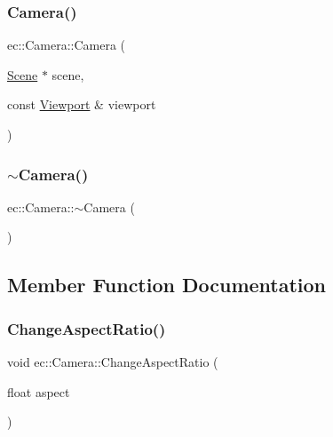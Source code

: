 \mbox{\label{classec_1_1_camera_ab5fa55c91ae586754b613c3e8f33b31c}} 
\subsubsection{\texorpdfstring{Camera()}{Camera()}\hspace{0.1cm}{\footnotesize\ttfamily [2/2]}}
{\footnotesize\ttfamily ec\+::\+Camera\+::\+Camera (\begin{DoxyParamCaption}\item[{\mbox{\hyperlink{classec_1_1_scene}{Scene}} $\ast$}]{scene,  }\item[{const \mbox{\hyperlink{classec_1_1_viewport}{Viewport}} \&}]{viewport }\end{DoxyParamCaption})\hspace{0.3cm}{\ttfamily [explicit]}}

\mbox{\label{classec_1_1_camera_a11d706554e37d6dde0b9313a445cbd4b}} 
\subsubsection{\texorpdfstring{$\sim$\+Camera()}{~Camera()}}
{\footnotesize\ttfamily ec\+::\+Camera\+::$\sim$\+Camera (\begin{DoxyParamCaption}{ }\end{DoxyParamCaption})}



\subsection{Member Function Documentation}
\mbox{\label{classec_1_1_camera_ad3790ce4b558aa906fe00e25d8c8c1ed}} 
\subsubsection{\texorpdfstring{Change\+Aspect\+Ratio()}{ChangeAspectRatio()}}
{\footnotesize\ttfamily void ec\+::\+Camera\+::\+Change\+Aspect\+Ratio (\begin{DoxyParamCaption}\item[{float}]{aspect }\end{DoxyParamCaption})}

